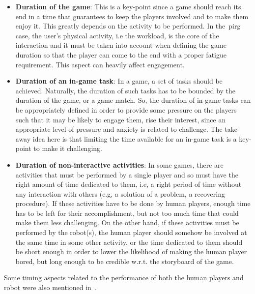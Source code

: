 \begin{itemize}
\item \textbf{Duration of the game}: This is a key-point since a game should reach its end in a time that guarantees to keep the players involved and to make them enjoy it. This greatly depends on the activity to be performed. In the~\gls{pirg} case, the user's physical activity, i.e the workload, is the core of the interaction and it must be taken into account when defining the game duration so that the player can come to the end with a proper fatigue requirement. This aspect can heavily affect engagement.

\item \textbf{Duration of an in-game task}: In a game, a set of tasks should be achieved. Naturally, the duration of such tasks has to be bounded by the duration of the game, or a game match. So, the duration of in-game tasks can be appropriately defined in order to provide some pressure on the players such that it may be likely to engage them, rise their interest, since an appropriate level of pressure and anxiety is related to challenge. The take-away idea here is that limiting the time available for an in-game task is a key-point to make it challenging.

\item \textbf{Duration of non-interactive activities}: In some games, there are activities that must be performed by a single player and so must have the right amount of time dedicated to them, i.e, a right period of time without any interaction with others (e.g, a solution of a problem, a recovering procedure). If these activities have to be done by human players, enough time has to be left for their accomplishment, but not too much time that could make them less challenging. On the other hand, if these activities must be performed by the robot(s), the human player should somehow be involved at the same time in some other activity, or the time dedicated to them should be short enough in order to lower the likelihood of making the human player bored, but long enough to be credible w.r.t. the storyboard of the game.
\end{itemize}

Some timing aspects related to the performance of both the human players and robot were also mentioned in~\cite{bonarini_timing_2014}.

